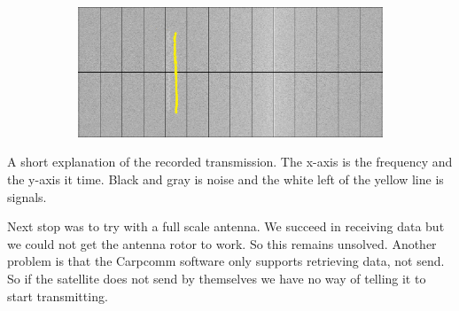 \begin{figure}
\begin{subfigure}{.5\textwidth}
	\centering
	\includegraphics[width=\textwidth]{Figures/sattelite_transmition}
	\label{fig: Transmission}
\end{subfigure}
\end{figure}
A short explanation of the recorded transmission. The x-axis is the frequency and the y-axis it time. Black and gray is noise and the white left of the yellow line is signals.  \n

 Next stop was to try with a full scale antenna. We succeed in receiving data but we could not get the antenna rotor to work. So this remains unsolved. Another problem is that the Carpcomm software only supports retrieving data, not send. So if the satellite does not send by themselves we have no way of telling it to start transmitting. \n




